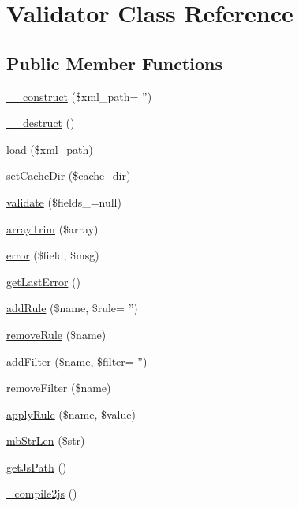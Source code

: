 \hypertarget{classValidator}{\section{Validator Class Reference}
\label{classValidator}
}
\subsection*{Public Member Functions}
\begin{DoxyCompactItemize}
\item 
\hyperlink{classValidator_abfd7a6c58dc8cedae5bef76325b7bf6e}{\+\_\+\+\_\+construct} (\$xml\+\_\+path= '')
\item 
\hyperlink{classValidator_aa076d09e847e8461281d4912688a9388}{\+\_\+\+\_\+destruct} ()
\item 
\hyperlink{classValidator_a43de0eb69cae01eee855f825324ffc39}{load} (\$xml\+\_\+path)
\item 
\hyperlink{classValidator_a1630131530dca60428e72dd4dd2d4af3}{set\+Cache\+Dir} (\$cache\+\_\+dir)
\item 
\hyperlink{classValidator_a05e34dac507b8d719e7f95f2cd0220bc}{validate} (\$fields\+\_\+=null)
\item 
\hyperlink{classValidator_ac4be365554a620a921f6846e80d76671}{array\+Trim} (\$array)
\item 
\hyperlink{classValidator_ad46fa003b320d64ef656b22de870782c}{error} (\$field, \$msg)
\item 
\hyperlink{classValidator_a3de1a1112e46b42ab6a89a4a13048504}{get\+Last\+Error} ()
\item 
\hyperlink{classValidator_a71cc158b6b3f52f03e1ddb34f4801906}{add\+Rule} (\$name, \$rule= '')
\item 
\hyperlink{classValidator_acc2d2fd527f54e1fed839a927a83c6b8}{remove\+Rule} (\$name)
\item 
\hyperlink{classValidator_a5f22a8ddf58df13376769ed422492e33}{add\+Filter} (\$name, \$filter= '')
\item 
\hyperlink{classValidator_a7613a0d6b468b5d5ade046a801b260db}{remove\+Filter} (\$name)
\item 
\hyperlink{classValidator_a8a8be8c74216e9d0ebbd99eb1e29b8d2}{apply\+Rule} (\$name, \$value)
\item 
\hyperlink{classValidator_a46de77869676b1b027a076c2106653e2}{mb\+Str\+Len} (\$str)
\item 
\hyperlink{classValidator_ae9037d1911390583a1358b25c03768e3}{get\+Js\+Path} ()
\item 
\hyperlink{classValidator_ae7b44a7a2bfb3ee4672b4cf2cdbd059f}{\+\_\+compile2js} ()
\end{DoxyCompactItemize}
